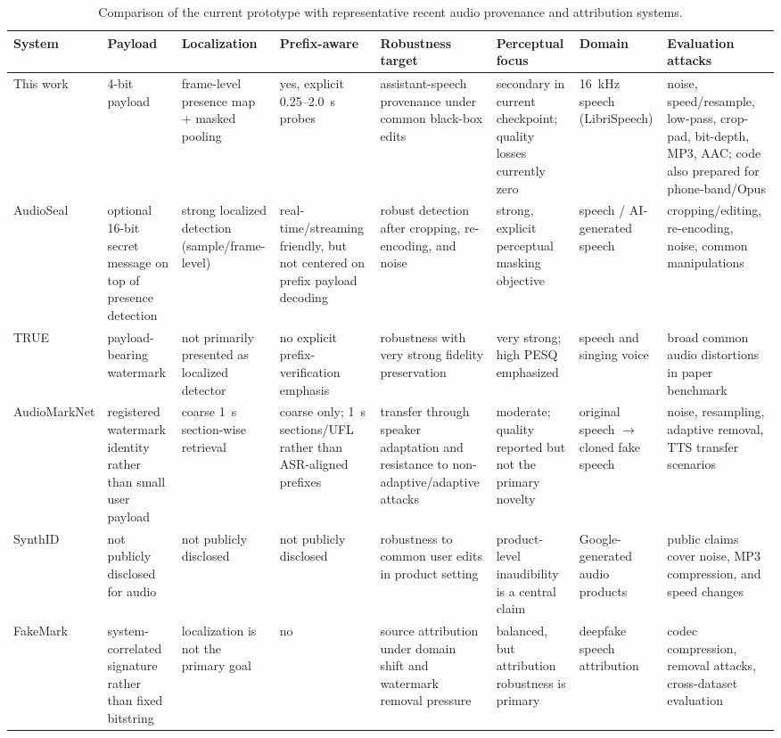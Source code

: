 \begin{table}[H]
\centering
\scriptsize
\setlength{\tabcolsep}{3pt}
\caption{Comparison of the current prototype with representative recent audio provenance and attribution systems.}
\label{tab:related_systems_compare}
\begin{tabular}{p{1.8cm}p{1.5cm}p{1.6cm}p{1.6cm}p{2.1cm}p{1.8cm}p{1.7cm}p{2.5cm}}
\toprule
\textbf{System} & \textbf{Payload} & \textbf{Localization} & \textbf{Prefix-aware} & \textbf{Robustness target} & \textbf{Perceptual focus} & \textbf{Domain} & \textbf{Evaluation attacks} \\
\midrule
This work & 4-bit payload & frame-level presence map + masked pooling & yes, explicit 0.25--2.0~s probes & assistant-speech provenance under common black-box edits & secondary in current checkpoint; quality losses currently zero & 16~kHz speech (LibriSpeech) & noise, speed/resample, low-pass, crop-pad, bit-depth, MP3, AAC; code also prepared for phone-band/Opus \\
\addlinespace[0.15em]
AudioSeal & optional 16-bit secret message on top of presence detection & strong localized detection (sample/frame-level) & real-time/streaming friendly, but not centered on prefix payload decoding & robust detection after cropping, re-encoding, and noise & strong, explicit perceptual masking objective & speech / AI-generated speech & cropping/editing, re-encoding, noise, common manipulations \\
\addlinespace[0.15em]
TRUE & payload-bearing watermark & not primarily presented as localized detector & no explicit prefix-verification emphasis & robustness with very strong fidelity preservation & very strong; high PESQ emphasized & speech and singing voice & broad common audio distortions in paper benchmark \\
\addlinespace[0.15em]
AudioMarkNet & registered watermark identity rather than small user payload & coarse 1~s section-wise retrieval & coarse only; 1~s sections/UFL rather than ASR-aligned prefixes & transfer through speaker adaptation and resistance to non-adaptive/adaptive attacks & moderate; quality reported but not the primary novelty & original speech $\rightarrow$ cloned fake speech & noise, resampling, adaptive removal, TTS transfer scenarios \\
\addlinespace[0.15em]
SynthID & not publicly disclosed for audio & not publicly disclosed & not publicly disclosed & robustness to common user edits in product setting & product-level inaudibility is a central claim & Google-generated audio products & public claims cover noise, MP3 compression, and speed changes \\
\addlinespace[0.15em]
FakeMark & system-correlated signature rather than fixed bitstring & localization is not the primary goal & no & source attribution under domain shift and watermark removal pressure & balanced, but attribution robustness is primary & deepfake speech attribution & codec compression, removal attacks, cross-dataset evaluation \\
\bottomrule
\end{tabular}
\end{table}

